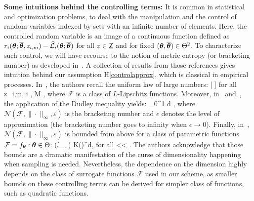 \documentclass[11pt]{article}
\theoremstyle{t}
\begin{document}
\textbf{Some intuitions behind the controlling terms:} It is  common in statistical and optimization problems, to deal with the manipulation and the control of random variables indexed by sets with an infinite number of elements. Here, the controlled random variable is an image of a continuous function defined as $r_i (\param ; \op, z_{i,m})  - \sur{i}{\param}{\op}$ for all $z \in \Zset$ and for fixed $(\param, \op) \in \Param^2$.
To characterize such control, we will have recourse to the notion of metric entropy (or bracketing number) as developed in~\citep{van2000asymptotic, vershynin2018high, wainwright2019high}.
A collection of results from those references gives intuition behind our assumption H\ref{controlapprox}, which is classical in empirical processes.
In~\citep[Theorem 8.2.3]{vershynin2018high}, the authors recall the uniform law of large numbers:
\beq\notag
\EE \left[\underset{f \in \mathcal{F}}{ \sup } \left|\frac{1}{M} \sum_{i=1}^{M} f\left(z_{i,m}\right)-\EE[f(z_i)]\right| \right] \leq {} \quad \textrm{for all} \quad z_{i,m}, i \in {}, M \rrbracket\eqsp,
\eeq
where $\mathcal{F}$ is a class of $L$-Lipschitz functions.
Moreover, in~\citep[Theorem 8.1.3 ]{vershynin2018high} and~\citep[Theorem 5.22]{wainwright2019high}, the application of the Dudley inequality yields:
\beq\notag
{} \leq {} \int_{0}^{1}  d \varepsilon\eqsp,
\eeq
where $\mathcal{N}\left(\mathcal{F},\|\cdot\|_{\infty}, \varepsilon\right)$ is the bracketing number and $\epsilon$ denotes the level of approximation (the bracketing number goes to infinity when $\epsilon  \to 0$). Finally, in~\citep[p.271, Example]{van2000asymptotic}, $\mathcal{N}\left(\mathcal{F},\|\cdot\|_{\infty}, \varepsilon\right)$ is bounded from above for a class of parametric functions $ \mathcal{F}= {f_{\param}: \param \in \Param}$:
\beq\notag
{}\left(,\|\cdot\|_{\infty}, \varepsilon\right) \leq K\left(\right)^{d}, \quad \textrm{for all} <\varepsilon< \Theta\eqsp.
\eeq
The authors acknowledge that those bounds are a dramatic manifestation of the curse of dimensionality happening when sampling is needed.
Nevertheless, the dependence on the dimension highly depends on the class of surrogate functions $\mathcal{F}$ used in our scheme, as smaller bounds on these controlling terms can be derived for simpler class of functions, such as quadratic functions.
\end{document}
